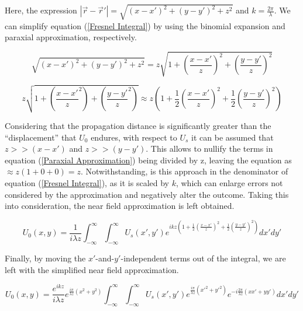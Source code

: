 Here, the expression $|\overrightarrow{r}-\overrightarrow{r}'| = \sqrt{(x-x')^2+(y-y')^2+z^2}$ and $k = \frac{2\pi}{\lambda}$. We can simplify equation (\ref{Fresnel Integral}) by using the binomial expansion and paraxial approximation, respectively.

\begin{equation}
    \sqrt{(x-x')^2+(y-y')^2+z^2} = z\sqrt{1 + \left( \frac{x - x'}{z} \right)^2 + \left( \frac{y - y'}{z} \right)^2}
    \label{Binomial Expansion}
\end{equation}

\begin{equation}
    z\sqrt{1 + \left( \frac{x - x'}{z}^2 \right) + \left( \frac{y - y'}{z}^2 \right)} \approx z \left( 1 + \frac{1}{2} \left( \frac{x - x'}{z} \right)^2 + \frac{1}{2} \left( \frac{y - y'}{z} \right)^2 \right)
    \label{Paraxial Approximation}
\end{equation}

Considering that the propagation distance is significantly greater than the ``displacement'' that $U_0$ endures, with respect to $U_s$ it can be assumed that $z >> (x-x')$ and $z >> (y-y')$. This allows to nullify the terms in equation (\ref{Paraxial Approximation}) being divided by z, leaving the equation as $\approx z(1+0+0) = z$. Notwithstanding, is this approach in the denominator of equation (\ref{Fresnel Integral}), as it is scaled by $k$, which can enlarge errors not considered by the approximation and negatively alter the outcome. Taking this into consideration, the near field approximation is left obtained.

\begin{equation}
    U_0(x,y) = \frac{1}{i\lambda z}\int_{-\infty}^{\infty}\int_{-\infty}^{\infty}U_s(x',y')e^{ikz \left( 1 + \frac{1}{2} \left( \frac{x - x'}{z} \right)^2 + \frac{1}{2} \left( \frac{y - y'}{z} \right)^2 \right)}dx'dy'
\end{equation}

Finally, by moving the $x'$-and-$y'$-independent terms out of the integral, we are left with the simplified near field approximation.

\begin{equation}
    U_0(x,y) = \frac{e^{ikz}}{i\lambda z}e^{\frac{i\pi}{\lambda z}(x^2+y^2)}\int_{-\infty}^{\infty}\int_{-\infty}^{\infty}U_s(x',y')e^{\frac{i\pi}{\lambda z}(x'^2+y'^2)}e^{-i\frac{2\pi}{\lambda z} (xx'+yy')}dx'dy'
    \label{Near Field Approximation}
\end{equation}

